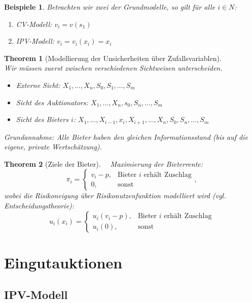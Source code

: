\documentclass[12pt]{extreport} %
\theoremstyle{named}
\newtheorem{unnamedtheorem}{Theorem} \counterwithin{unnamedtheorem}{chapter}
\theoremstyle{nnamed}
\theoremstyle{itshape}
\theoremstyle{normal}
\newtheorem*{beispiele}{Beispiele}
\begin{document}
\begin{beispiele}
	Betrachten wir zwei der Grundmodelle, so gilt für alle $i \in N$:
	\begin{enumerate}
		\item CV-Modell: $v_{i} = v(s_{1})$
		\item IPV-Modell: $v_{i} = v_{i}(x_{i}) = x_{i}$
	\end{enumerate}	
\end{beispiele}

\begin{unnamedtheorem}[Modellierung der Unsicherheiten über Zufallsvariablen] ~\\
	Wir müssen zuerst zwischen verschiedenen Sichtweisen unterscheiden.
	\begin{itemize}
		\item Externe Sicht: $X_{1}, \dotsc, X_{n}, S_{0}, S_{1}, \dotsc, S_{m}$
		\item Sicht des Auktionators: $X_{1}, \dotsc, X_{n}, s_{0}, S_{n}, \dotsc, S_{m}$
		\item Sicht des Bieters $i$:  $X_{1}, \dotsc, X_{i-1}, x_{i}, X_{i+1}, \dotsc, X_{n}, S_{0}, S_{n}, \dotsc, S_{m}$
	\end{itemize}
	Grundannahme: Alle Bieter haben den gleichen Informationsstand (bis auf die eigene, private Wertschätzung).
\end{unnamedtheorem}

\newpage

\begin{unnamedtheorem}[Ziele der Bieter] ~\
		Maximierung der Bieterrente:
		$$ \pi_{i} = \begin{cases} v_{i} - p, & \text{Bieter $i$ erhält Zuschlag} \\ 0, & \text{sonst} \end{cases},$$
		wobei die  Risikoneigung über Risikonutzenfunktion modelliert wird (vgl. Entscheidungstheorie):
		$$ u_{i}(x_{i}) = \begin{cases} u_{i}(v_{i}-p), & \text{Bieter $i$ erhält Zuschlag} \\ u_{i}(0), & \text{sonst} \end{cases} $$ 
\end{unnamedtheorem}

\chapter{Eingutauktionen}

\section{IPV-Modell}
\end{document}
